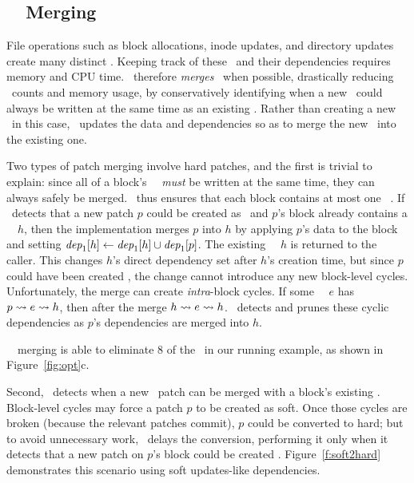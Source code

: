 
\subsection{\Nrb\ \Patch\ Merging}
\label{sec:patch:merge}

File operations such as block allocations, inode updates, and directory updates
create many distinct \patches. Keeping track of these
\patches\ and their dependencies requires memory and
CPU time.
%
\Kudos\ therefore \emph{merges} \patches\ when possible, drastically reducing
\patch\ counts and memory usage, by conservatively identifying when a
new \patch\ could always be written at the same time as an existing \patch.
%
Rather than creating a new \patch\ in this case, \Kudos\ updates the data
and dependencies so as to merge the new \patch\ into the existing one.


Two types of patch merging involve hard patches, and the first is trivial
to explain:
%
since all of a block's \nrb\ \patches\ \emph{must} be written at the same
time, they can always safely be merged.
%
\Kudos\ thus ensures that each block contains at most one \nrb\ \patch.
%
If \Kudos\ detects that a new patch $p$ could be created as \nrb\ and $p$'s
block already contains a \nrb\ \patch\ $h$, then
%
the implementation merges $p$ into $h$ by applying $p$'s data to the block
and setting $\textit{dep}_1[h] \gets \textit{dep}_1[h] \cup \textit{dep}_1[p]$.
%
The existing \nrb\ \patch\ $h$ is returned to the caller.
%
This changes $h$'s direct dependency set after $h$'s creation time, but
since $p$ could have been created \nrb, the change cannot introduce any new
block-level cycles.
%
Unfortunately, the merge can create \emph{intra}-block cycles.
%
If some \noop\ \patch\ $e$ has $p \leadsto e \leadsto h$, then after
the merge $h \leadsto e \leadsto h$.
%
\Kudos\ detects and prunes these cyclic
dependencies as $p$'s dependencies are merged into $h$.


\Nrb\ \patch\ merging is able to eliminate 8 of the \patches\ in our running
example, as shown in Figure~\ref{fig:opt}c.


Second, \Featherstitch\ detects when a new \nrb\ patch can be merged with
 a block's existing \emph{\rb} \patches.
%
Block-level cycles may force a patch $p$ to be created as soft.
%
Once those cycles are broken (because the relevant patches commit), $p$
 could be converted to hard; but to avoid unnecessary work,
%
\Kudos\ delays the conversion, performing it only when it detects that a
 new patch on $p$'s block could be created \nrb.
%
Figure~\ref{f:soft2hard} demonstrates this scenario using soft updates-like
 dependencies.


